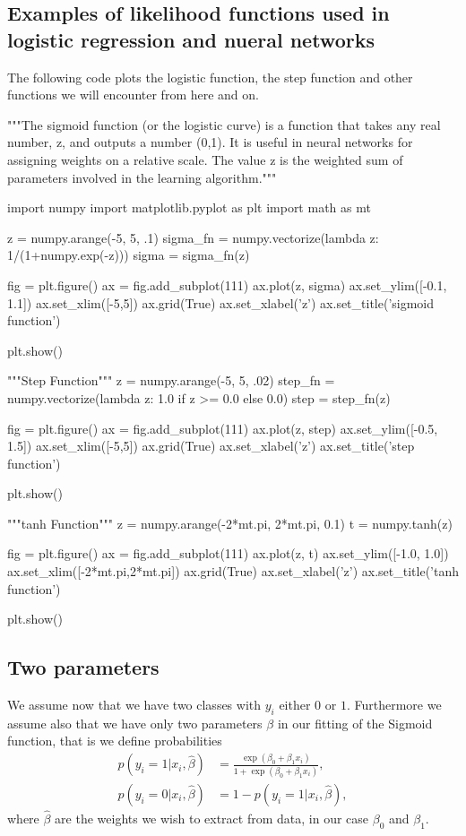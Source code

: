 \documentclass[%
oneside,                 %
final,                   %
10pt]{article}
\begin{document}
\subsection{Examples of likelihood functions used in logistic regression and nueral networks}


The following code plots the logistic function, the step function and other functions we will encounter from here and on.


\bpycod
"""The sigmoid function (or the logistic curve) is a
function that takes any real number, z, and outputs a number (0,1).
It is useful in neural networks for assigning weights on a relative scale.
The value z is the weighted sum of parameters involved in the learning algorithm."""

import numpy
import matplotlib.pyplot as plt
import math as mt

z = numpy.arange(-5, 5, .1)
sigma_fn = numpy.vectorize(lambda z: 1/(1+numpy.exp(-z)))
sigma = sigma_fn(z)

fig = plt.figure()
ax = fig.add_subplot(111)
ax.plot(z, sigma)
ax.set_ylim([-0.1, 1.1])
ax.set_xlim([-5,5])
ax.grid(True)
ax.set_xlabel('z')
ax.set_title('sigmoid function')

plt.show()

"""Step Function"""
z = numpy.arange(-5, 5, .02)
step_fn = numpy.vectorize(lambda z: 1.0 if z >= 0.0 else 0.0)
step = step_fn(z)

fig = plt.figure()
ax = fig.add_subplot(111)
ax.plot(z, step)
ax.set_ylim([-0.5, 1.5])
ax.set_xlim([-5,5])
ax.grid(True)
ax.set_xlabel('z')
ax.set_title('step function')

plt.show()

"""tanh Function"""
z = numpy.arange(-2*mt.pi, 2*mt.pi, 0.1)
t = numpy.tanh(z)

fig = plt.figure()
ax = fig.add_subplot(111)
ax.plot(z, t)
ax.set_ylim([-1.0, 1.0])
ax.set_xlim([-2*mt.pi,2*mt.pi])
ax.grid(True)
ax.set_xlabel('z')
ax.set_title('tanh function')

plt.show()
\epycod







\subsection{Two parameters}

We assume now that we have two classes with $y_i$ either $0$ or $1$. Furthermore we assume also that we have only two parameters $\beta$ in our fitting of the Sigmoid function, that is we define probabilities 
\begin{align*}
p(y_i=1|x_i,\hat{\beta}) &= \frac{\exp{(\beta_0+\beta_1x_i)}}{1+\exp{(\beta_0+\beta_1x_i)}},\nonumber\\
p(y_i=0|x_i,\hat{\beta}) &= 1 - p(y_i=1|x_i,\hat{\beta}),
\end{align*}
where $\hat{\beta}$ are the weights we wish to extract from data, in our case $\beta_0$ and $\beta_1$. 
\end{document}
